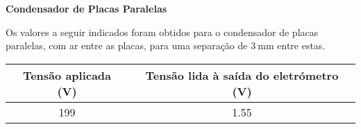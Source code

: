 %
%

\question

\textbf{Condensador de Placas Paralelas}

Os valores a seguir indicados foram obtidos para o condensador de placas paralelas, com ar entre as placas, para uma separa\c{c}\~{a}o de $3~\text{mm}$ entre estas.

\begin{center}
\begin{tabular}{c|c}
Tens\~{a}o aplicada (V) & Tens\~{a}o lida \`{a} sa\'{i}da do eletr\'{o}metro (V)\\ 
\hline 
199 & 1.55 \\ 
\end{tabular}
\end{center}

